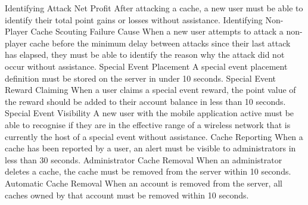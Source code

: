 		\nonfuncreq
			{Identifying Attack Net Profit}
			{After attacking a cache, a new user must be able to identify their
			total point gains or losses without assistance.}
		\nonfuncreq
			{Identifying Non-Player Cache Scouting Failure Cause}
			{When a new user attempts to attack a non-player cache before the
			minimum delay between attacks since their last attack has elapsed,
			they must be able to identify the reason why the attack did not
			occur without assistance.}
		\nonfuncreq
			{Special Event Placement}
			{A special event placement definition must be stored on the server
			in under 10 seconds.}
		\nonfuncreq
			{Special Event Reward Claiming}
			{When a user claims a special event reward, the point value of the
			reward should be added to their account balance in less than 10
			seconds.}
		\nonfuncreq
			{Special Event Visibility}
			{A new user with the mobile application active must be able to
			recognise if they are in the effective range of a wireless network
			that is currently the host of a special event without assistance.}
		\nonfuncreq
			{Cache Reporting}
			{When a cache has been reported by a user, an alert must be
			visible to administrators in less than 30 seconds.}
		\nonfuncreq
			{Administrator Cache Removal}
			{When an administrator deletes a cache, the cache must be removed
			from the server within 10 seconds.}
		\nonfuncreq
			{Automatic Cache Removal}
			{When an account is removed from the server, all caches owned by
			that account must be removed within 10 seconds.}
